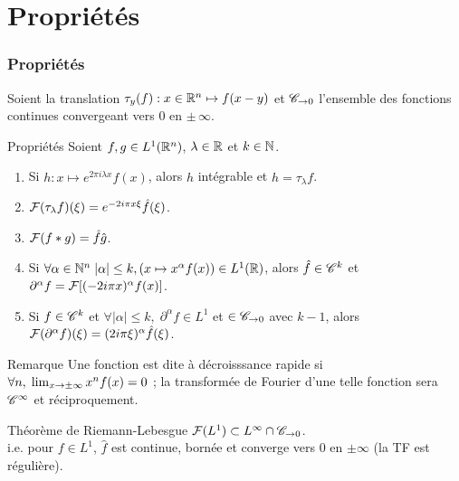 \documentclass[usenames,dvipsnames,aspectratio=169]{beamer} %
\begin{document}

\section{Propriétés}



\begin{frame}
\frametitle{Propriétés}

Soient la translation $\tau_y(f) : x\in\mathbb{R}^n \mapsto f(x-y)$ et $\mathscr{C}_{\rightarrow0}$ l'ensemble des fonctions continues convergeant vers $0$ en $\pm\,\infty$.

\begin{block}{Propriétés}
Soient $f,g\in L^1(\mathbb{R}^n)$, $\lambda\in\mathbb{R}$ et $k\in\mathbb{N}$.

\begin{enumerate}
    \item Si $h : x\mapsto e^{2\pi i \lambda x}f(x)$, alors $h$ intégrable et $\hat{h}=\tau_\lambda f$.\pause
    \item $\fF(\tau_\lambda f)(\xi) = e^{-2i\pi x\xi} \hat{f}(\xi)$.\pause
    \item $\fF (f \ast g) = \hat{f}\hat{g}$.\pause
    \item Si $\forall \alpha\in\mathbb{N}^n\; |\alpha|\leq k, (x\mapsto x^\alpha f(x))\in L^1(\mathbb{R})$, alors $\hat{f}\in\mathscr{C}^k$ et $\partial^\alpha f = \fF[(-2i\pi x)^\alpha f(x)]$.\pause
    \item Si $f\in\mathscr{C}^k$ et $\forall |\alpha|\leq k, \;\partial^\alpha f\in L^1$ et $\in \mathscr{C}_{\rightarrow 0}$ avec $k-1$, alors $\fF(\partial^\alpha f)(\xi) = (2i\pi\xi)^\alpha \hat{f}(\xi)$.
\end{enumerate}

\end{block}

\end{frame}


\begin{frame}{Remarque}
Une fonction est dite à décroisssance rapide si $\forall n, \; \lim_{x\rightarrow\pm\infty} x^n f(x) = 0$ ; la transformée de Fourier d'une telle fonction sera $\mathscr{C}^\infty$ et réciproquement.\\

\pause
\begin{block}{Théorème de Riemann-Lebesgue}
$\fF(L^1)\subset L^\infty \cap \sC_{\ra 0}$.\\
i.e. pour $f\in L^1$, $\hat{f}$ est continue, bornée et converge vers $0$ en $\pm\infty$ (la TF est régulière).

\end{block}


\end{frame}
\end{document}
